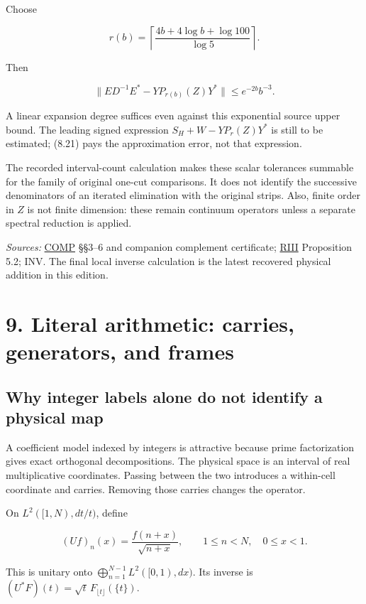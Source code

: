 \documentclass[
  10pt,
  a4paper,
  10pt,
  oneside,
  openany]{book}
\begin{document}
Choose

\[
r(b)=\left\lceil\frac{4b+4\log b+\log100}{\log5}\right\rceil.
\tag{8.20}\label{eq:8.20}
\]

Then

\[
\|ED^{-1}E^*-YP_{r(b)}(Z)Y^*\|
\le e^{-2b}b^{-3}.
\tag{8.21}\label{eq:8.21}
\]

A linear expansion degree suffices even against this exponential source
upper bound. The leading signed expression \(S_H+W-YP_r(Z)Y^*\) is still
to be estimated; (8.21) pays the approximation error, not that
expression.

The recorded interval-count calculation makes these scalar tolerances
summable for the family of original one-cut comparisons. It does not
identify the successive denominators of an iterated elimination with the
original strips. Also, finite order in \(Z\) is not finite dimension:
these remain continuum operators unless a separate spectral reduction is
applied.

\emph{Sources:} \hyperref[source-comp]{COMP} §§3--6 and companion
complement certificate; \hyperref[source-riii]{RIII} Proposition 5.2;
INV. The final local inverse calculation is the latest recovered
physical addition in this edition.

\section{9. Literal arithmetic: carries, generators, and
frames}\label{ch-carries}

\subsection{Why integer labels alone do not identify a physical
map}\label{why-integer-labels-alone-do-not-identify-a-physical-map}

A coefficient model indexed by integers is attractive because prime
factorization gives exact orthogonal decompositions. The physical space
is an interval of real multiplicative coordinates. Passing between the
two introduces a within-cell coordinate and carries. Removing those
carries changes the operator.

On \(L^2([1,N),dt/t)\), define

\[
(Uf)_n(x)=\frac{f(n+x)}{\sqrt{n+x}},
\qquad 1\le n<N,\quad0\le x<1.
\tag{9.1}\label{eq:9.1}
\]

This is unitary onto \(\bigoplus_{n=1}^{N-1}L^2([0,1),dx)\). Its inverse
is \((U^*F)(t)=\sqrt t\,F_{\lfloor t\rfloor}(\{t\})\).
\end{document}

